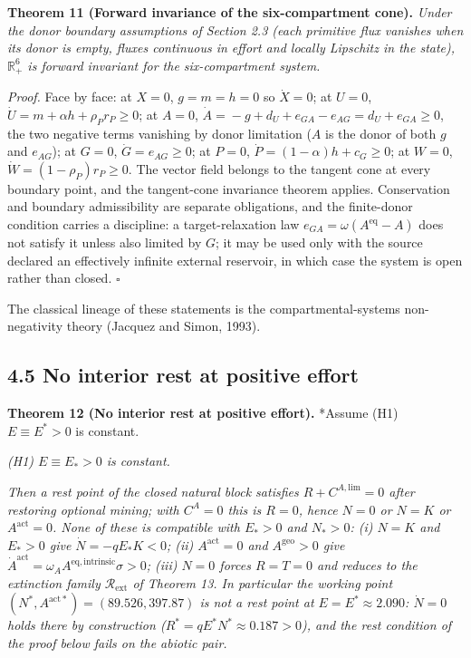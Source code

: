 \documentclass[11pt]{article}
\begin{document}
\textbf{Theorem 11 (Forward invariance of the six-compartment cone).} \emph{Under the donor boundary assumptions of Section 2.3 (each primitive flux vanishes when its donor is empty, fluxes continuous in effort and locally Lipschitz in the state), \(\mathbb{R}^6_+\) is forward invariant for the six-compartment system.}

\emph{Proof.} Face by face: at \(X = 0\), \(g = m = h = 0\) so \(\dot X = 0\); at \(U = 0\), \(\dot U =\allowbreak{} m +\allowbreak{} \alpha h +\allowbreak{} \rho_P r_P \ge 0\); at \(A = 0\), \(\dot A =\allowbreak{} -g +\allowbreak{} d_U +\allowbreak{} e_{GA} - e_{AG} =\allowbreak{} d_U +\allowbreak{} e_{GA} \ge 0\), the two negative terms vanishing by donor limitation (\(A\) is the donor of both \(g\) and \(e_{AG}\)); at \(G = 0\), \(\dot G = e_{AG} \ge 0\); at \(P = 0\), \(\dot P =\allowbreak{} (1-\alpha)h +\allowbreak{} c_G \ge 0\); at \(W = 0\), \(\dot W = (1-\rho_P)r_P \ge 0\). The vector field belongs to the tangent cone at every boundary point, and the tangent-cone invariance theorem applies. Conservation and boundary admissibility are separate obligations, and the finite-donor condition carries a discipline: a target-relaxation law \(e_{GA} =\allowbreak{} \omega(A^{\mathrm{eq}} - A)\) does not satisfy it unless also limited by \(G\); it may be used only with the source declared an effectively infinite external reservoir, in which case the system is open rather than closed. \(\square\)

The classical lineage of these statements is the compartmental-systems non-negativity theory (Jacquez and Simon, 1993).

\subsection*{4.5 No interior rest at positive effort}\label{45-no-interior-rest-at-positive-effort}

\textbf{Theorem 12 (No interior rest at positive effort).} *Assume (H1) \(E\equiv E^*>0\) is constant.

\emph{(H1) \(E \equiv E_* > 0\) is constant.}

\emph{Then a rest point of the closed natural block satisfies \(R + C^{A,\mathrm{lim}} = 0\) after restoring optional mining; with \(C^A = 0\) this is \(R = 0\), hence \(N = 0\) or \(N = K\) or \(A^{\mathrm{act}} = 0\). None of these is compatible with \(E_* > 0\) and \(N_* > 0\): (i) \(N = K\) and \(E_* > 0\) give \(\dot N = -qE_* K < 0\); (ii) \(A^{\mathrm{act}} = 0\) and \(A^{\mathrm{geo}} > 0\) give \(\dot A^{\mathrm{act}} =\allowbreak{} \omega_A A^{\mathrm{eq,\allowbreak{}intrinsic}} \sigma > 0\); (iii) \(N = 0\) forces \(R = T = 0\) and reduces to the extinction family \(\mathcal{R}_{\mathrm{ext}}\) of Theorem 13. In particular the working point \((N^*,\allowbreak{} A^{\mathrm{act}*}) =\allowbreak{} (89.526,\allowbreak{} 397.87)\) is not a rest point at \(E = E^* \approx 2.090\): \(\dot N = 0\) holds there by construction (\(R^* =\allowbreak{} qE^*N^* \approx 0.187 > 0\)), and the rest condition of the proof below fails on the abiotic pair.}
\end{document}
